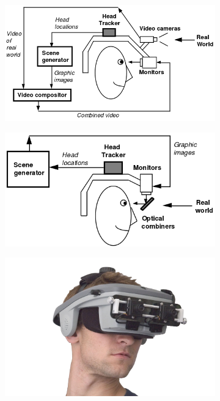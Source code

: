 \begin{figure}
\centering 
\begin{subfigure}{0.49\textwidth}
\includegraphics[width=\linewidth]{schemas/videoST_hmd}
\end{subfigure}
\hspace{\fill}
\begin{subfigure}{0.49\textwidth}
\includegraphics[width=\linewidth]{schemas/opticalST_hmd}
\end{subfigure}
\vspace*{0.3cm} %
\begin{subfigure}{0.49\textwidth}
\includegraphics[width=\linewidth]{pictures/videoST_example}

\end{subfigure}
\end{figure}
